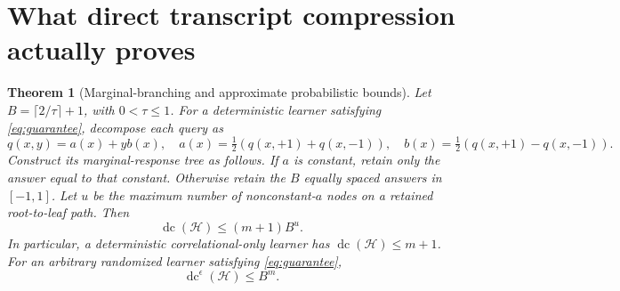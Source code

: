 \documentclass[11pt]{article}
\newtheorem{theorem}{Theorem}
\DeclareMathOperator{\dc}{dc}
\newcommand{\1}{\mathbf 1}
\newcommand{\cH}{\mathcal H}
\begin{document}
\section{What direct transcript compression actually proves}
\begin{theorem}[Marginal-branching and approximate probabilistic bounds]\label{thm:tree}
Let $B=\lceil2/\tau\rceil+1$, with $0<\tau\leq1$. For a deterministic learner satisfying \eqref{eq:guarantee}, decompose each query as
\[
 q(x,y)=a(x)+yb(x),\quad
 a(x)=\tfrac12(q(x,+1)+q(x,-1)),\quad
 b(x)=\tfrac12(q(x,+1)-q(x,-1)).
\]
Construct its marginal-response tree as follows. If $a$ is constant, retain only the answer equal to that constant. Otherwise retain the $B$ equally spaced answers in $[-1,1]$. Let $u$ be the maximum number of nonconstant-$a$ nodes on a retained root-to-leaf path. Then
\begin{equation}\label{eq:tree}
 \dc(\cH)\leq(m+1)B^u.
\end{equation}
In particular, a deterministic correlational-only learner has $\dc(\cH)\leq m+1$.
For an arbitrary randomized learner satisfying \eqref{eq:guarantee},
\begin{equation}\label{eq:approx}
 \dc^{\epsilon}(\cH)\leq B^m.
\end{equation}
\end{theorem}
\end{document}
